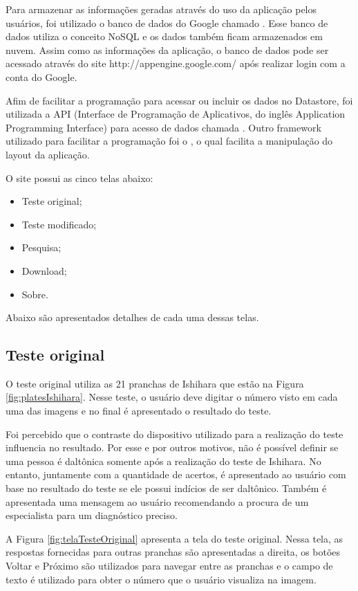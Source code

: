 \documentclass[	12pt, Times, openright, twoside, a4paper, english, brazil]{abntex2}
\begin{document}
Para armazenar as informações geradas através do uso da aplicação pelos usuários, foi utilizado o banco de dados do Google chamado . Esse banco de dados utiliza o conceito NoSQL e os dados também ficam armazenados em nuvem. Assim como as informações da aplicação, o banco de dados pode ser acessado através do site http://appengine.google.com/ após realizar login com a conta do Google.

Afim de facilitar a programação para acessar ou incluir os dados no Datastore, foi utilizada a API (Interface de Programação de Aplicativos, do inglês Application Programming Interface) para acesso de dados chamada . Outro framework utilizado para facilitar a programação foi o , o qual facilita a manipulação do layout da aplicação.

O site possui as cinco telas abaixo:

\begin{itemize}
\item Teste original;
\item Teste modificado;
\item Pesquisa;
\item Download;
\item Sobre.
\end{itemize}

Abaixo são apresentados detalhes de cada uma dessas telas.

\subsection{Teste original}
O teste original utiliza as 21 pranchas de Ishihara que estão na Figura \ref{fig:platesIshihara}. Nesse teste, o usuário deve digitar o número visto em cada uma das imagens e no final é apresentado o resultado do teste. 

Foi percebido que o contraste do dispositivo utilizado para a realização do teste influencia no resultado. Por esse e por outros motivos, não é possível definir se uma pessoa é daltônica somente após a realização do teste de Ishihara. No entanto, juntamente com a quantidade de acertos, é apresentado ao usuário com base no resultado do teste se ele possui indícios de ser daltônico. Também é apresentada uma mensagem ao usuário recomendando a procura de um especialista para um diagnóstico preciso.

A Figura \ref{fig:telaTesteOriginal} apresenta a tela do teste original. Nessa tela, as respostas fornecidas para outras pranchas são apresentadas a direita, os botões Voltar e Próximo são utilizados para navegar entre as pranchas e o campo de texto é utilizado para obter o número que o usuário visualiza na imagem.
\end{document}
